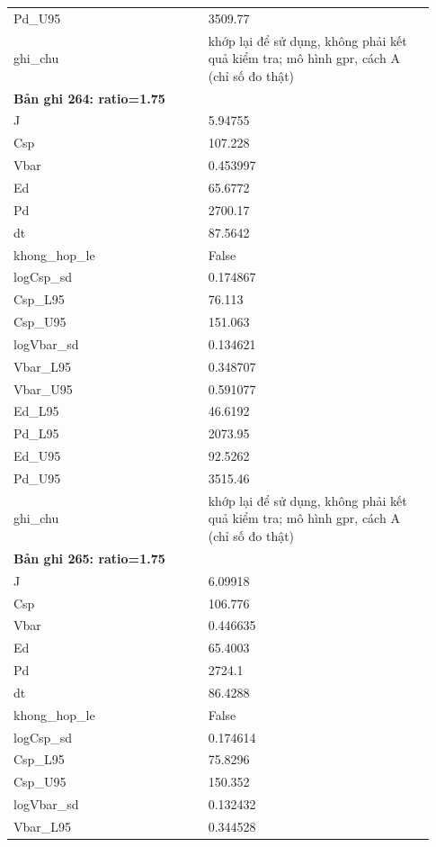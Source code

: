 \begin{longtable}{p{0.43\linewidth}p{0.50\linewidth}}
Pd\_\allowbreak U95 & 3509.77 \\
ghi\_\allowbreak chu & khớp lại để sử dụng, không phải kết quả kiểm tra; mô hình gpr, cách A (chỉ số đo thật) \\
\midrule
\multicolumn{2}{p{0.95\linewidth}}{\textbf{Bản ghi 264: ratio=1.75}} \\
J & 5.94755 \\
Csp & 107.228 \\
Vbar & 0.453997 \\
Ed & 65.6772 \\
Pd & 2700.17 \\
dt & 87.5642 \\
khong\_\allowbreak hop\_\allowbreak le & False \\
logCsp\_\allowbreak sd & 0.174867 \\
Csp\_\allowbreak L95 & 76.113 \\
Csp\_\allowbreak U95 & 151.063 \\
logVbar\_\allowbreak sd & 0.134621 \\
Vbar\_\allowbreak L95 & 0.348707 \\
Vbar\_\allowbreak U95 & 0.591077 \\
Ed\_\allowbreak L95 & 46.6192 \\
Pd\_\allowbreak L95 & 2073.95 \\
Ed\_\allowbreak U95 & 92.5262 \\
Pd\_\allowbreak U95 & 3515.46 \\
ghi\_\allowbreak chu & khớp lại để sử dụng, không phải kết quả kiểm tra; mô hình gpr, cách A (chỉ số đo thật) \\
\midrule
\multicolumn{2}{p{0.95\linewidth}}{\textbf{Bản ghi 265: ratio=1.75}} \\
J & 6.09918 \\
Csp & 106.776 \\
Vbar & 0.446635 \\
Ed & 65.4003 \\
Pd & 2724.1 \\
dt & 86.4288 \\
khong\_\allowbreak hop\_\allowbreak le & False \\
logCsp\_\allowbreak sd & 0.174614 \\
Csp\_\allowbreak L95 & 75.8296 \\
Csp\_\allowbreak U95 & 150.352 \\
logVbar\_\allowbreak sd & 0.132432 \\
Vbar\_\allowbreak L95 & 0.344528 \\

\end{longtable}
